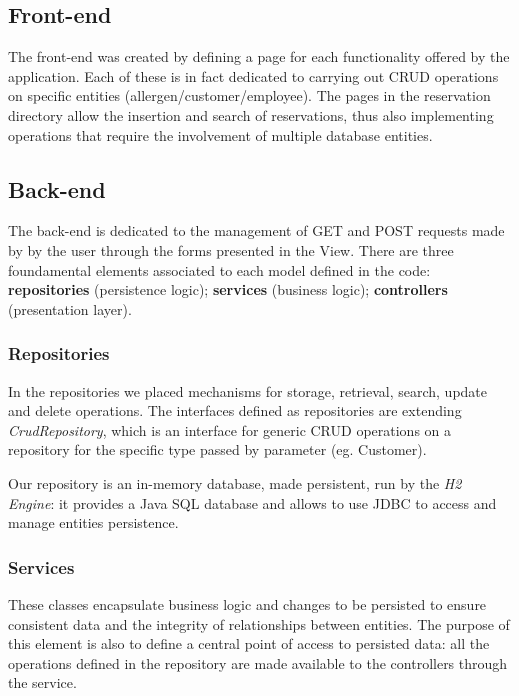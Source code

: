 \documentclass{article}
\begin{document}
\begin{multicols}{2}
\subsection*{Front-end}
The front-end was created by defining a page for each functionality offered by the application. Each of these is in fact dedicated to carrying out CRUD operations on specific entities (allergen/customer/employee). The pages in the reservation directory allow the insertion and search of reservations, thus also implementing operations that require the involvement of multiple database entities.

\subsection*{Back-end}
The back-end is dedicated to the management of GET and POST requests made by by the user through the forms presented in the View. There are three foundamental elements associated to each model defined in the code: \textbf{repositories} (persistence logic); \textbf{services} (business logic); \textbf{controllers} (presentation layer).

\subsubsection*{Repositories}
In the repositories we placed mechanisms for storage, retrieval, search, update and delete operations. The interfaces defined as repositories are extending \textit{CrudRepository}, which is an interface for generic CRUD operations on a repository for the specific type passed by parameter (eg. Customer).

Our repository is an in-memory database, made persistent, run by the \textit{H2 Engine}: it provides a Java SQL database and allows to use JDBC to access and manage entities persistence.

\subsubsection*{Services}
These classes encapsulate business logic and changes to be persisted to ensure consistent data and the integrity of relationships between entities.
The purpose of this element is also to define a central point of access to persisted data: all the operations defined in the repository are made available to the controllers through the service.

\end{multicols}
\end{document}
